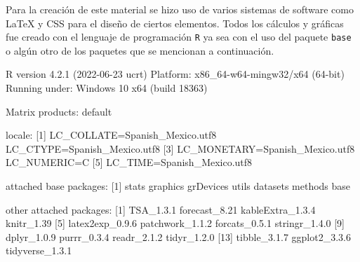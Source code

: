 \documentclass[
  a4paper,
  oneside,
  openany]{book}
\newenvironment{Shaded}{\begin{snugshade}}{\end{snugshade}}
\newcommand{\NormalTok}[1]{#1}
\begin{document}
Para la creación de este material se hizo uso de varios sistemas de software como LaTeX y CSS para el diseño de ciertos elementos. Todos los cálculos y gráficas fue creado con el lenguaje de programación \texttt{R} ya sea con el uso del paquete \texttt{base} o algún otro de los paquetes que se mencionan a continuación.

\begin{Shaded}
\begin{Highlighting}[]
\NormalTok{R version 4.2.1 (2022{-}06{-}23 ucrt)}
\NormalTok{Platform: x86\_64{-}w64{-}mingw32/x64 (64{-}bit)}
\NormalTok{Running under: Windows 10 x64 (build 18363)}

\NormalTok{Matrix products: default}

\NormalTok{locale:}
\NormalTok{[1] LC\_COLLATE=Spanish\_Mexico.utf8  LC\_CTYPE=Spanish\_Mexico.utf8   }
\NormalTok{[3] LC\_MONETARY=Spanish\_Mexico.utf8 LC\_NUMERIC=C                   }
\NormalTok{[5] LC\_TIME=Spanish\_Mexico.utf8    }

\NormalTok{attached base packages:}
\NormalTok{[1] stats     graphics  grDevices utils     datasets  methods   base     }

\NormalTok{other attached packages:}
\NormalTok{ [1] TSA\_1.3.1        forecast\_8.21    kableExtra\_1.3.4 knitr\_1.39      }
\NormalTok{ [5] latex2exp\_0.9.6  patchwork\_1.1.2  forcats\_0.5.1    stringr\_1.4.0   }
\NormalTok{ [9] dplyr\_1.0.9      purrr\_0.3.4      readr\_2.1.2      tidyr\_1.2.0     }
\NormalTok{[13] tibble\_3.1.7     ggplot2\_3.3.6    tidyverse\_1.3.1 }


\end{Highlighting}
\end{Shaded}
\end{document}
